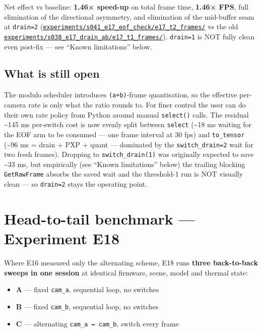 Net effect vs baseline: \textbf{1.46× speed-up} on total frame time,
\textbf{1.46× FPS}, full elimination of the directional asymmetry, and
elimination of the mid-buffer seam at \texttt{drain=2}
(\href{../experiments/s041_e17_eof_check/e17_t2_frames/}{\texttt{experiments/s041\_e17\_eof\_check/e17\_t2\_frames/}}
vs the old
\href{../experiments/s038_e17_drain_ab/e17_t1_frames/}{\texttt{experiments/s038\_e17\_drain\_ab/e17\_t1\_frames/}}).
\texttt{drain=1} is NOT fully clean even post-fix --- see ``Known
limitations'' below.

\subsection{What is still open}\label{what-is-still-open}

The modulo scheduler introduces \texttt{(a+b)}-frame quantisation, so
the effective per-camera rate is only what the ratio rounds to. For
finer control the user can do their own rate policy from Python around
manual \texttt{select()} calls. The residual \textasciitilde145 ms
per-switch cost is now evenly split between \texttt{select}
(\textasciitilde18 ms waiting for the EOF arm to be consumed --- one
frame interval at 30 fps) and \texttt{to\_tensor} (\textasciitilde96 ms
= drain + PXP + quant --- dominated by the \texttt{switch\_drain=2} wait
for two fresh frames). Dropping to \texttt{switch\_drain(1)} was
originally expected to save \textasciitilde33 ms, but empirically (see
``Known limitations'' below) the trailing blocking \texttt{GetRawFrame}
absorbs the saved wait and the threshold-1 run is NOT visually clean ---
so \texttt{drain=2} stays the operating point.

\section{Head-to-tail benchmark --- Experiment
E18}\label{head-to-tail-benchmark-experiment-e18}

Where E16 measured only the alternating scheme, E18 runs \textbf{three
back-to-back sweeps in one session} at identical firmware, scene, model
and thermal state:

\begin{itemize}
\tightlist
\item
  \textbf{A} --- fixed \texttt{cam\_a}, sequential loop, no switches
\item
  \textbf{B} --- fixed \texttt{cam\_b}, sequential loop, no switches
\item
  \textbf{C} --- alternating \texttt{cam\_a\ ↔\ cam\_b}, switch every
  frame
\end{itemize}

